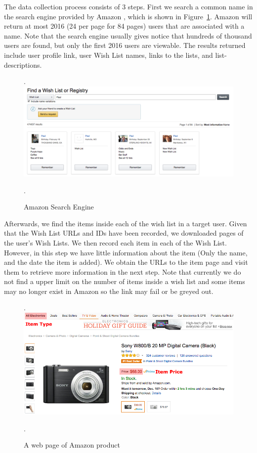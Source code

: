 \documentclass{llncs}
\begin{document}
The data collection process consists of 3 steps.
First we search a common name in the search engine provided by Amazon \cite{searcheng}, which is shown in Figure~\ref{searcheng}. Amazon will return at most 2016 (24 per page for 84 pages) users that are associated with a name. Note that the search engine usually gives notice that hundreds of thousand users are found, but only the first 2016 users are viewable. The results returned include user profile link, user Wish List names, links to the lists, and list-descriptions.

\begin{figure}[H].
\centering
\includegraphics[width=.85\textwidth]{searcheng.png}
\caption{Amazon Search Engine}.
\label{searcheng}
\end{figure}

Afterwards, we find the items inside each of the wish list in a target user. Given that the Wish List URLs and IDs have been recorded, we downloaded pages of the user's Wish Lists. We then record each item in each of the Wish List. However, in this step we have little information about the item (Only the name, and the date the item is added). We obtain the URLs to the item page and visit them to retrieve more information in the next step. Note that currently we do not find a upper limit on the number of items inside a wish list and some items may no longer exist in Amazon so the link may fail or be greyed out. 

\begin{figure}[H].
\centering
\includegraphics[width=.85\textwidth]{item.png}
\caption{A web page of Amazon product}.
\label{itempage}
\end{figure}
\end{document}

